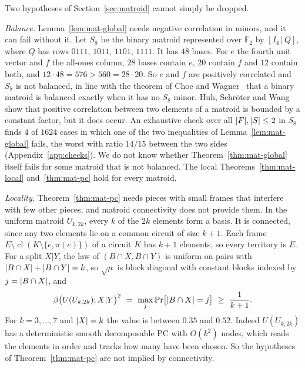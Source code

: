 Two hypotheses of Section~\ref{sec:matroid} cannot simply be dropped.

\emph{Balance.} Lemma~\ref{lem:mat-global} needs negative correlation in minors, and it can fail without it. Let $S_8$ be the binary matroid represented over $\mathbb F_2$ by $[I_4\,|\,Q]$, where $Q$ has rows $0111$, $1011$, $1101$, $1111$. It has $48$ bases. For $e$ the fourth unit vector and $f$ the all-ones column, $28$ bases contain $e$, $20$ contain $f$ and $12$ contain both, and $12\cdot48=576>560=28\cdot20$. So $e$ and $f$ are positively correlated and $S_8$ is not balanced, in line with the theorem of Choe and Wagner~\cite{ChoeWagner03} that a binary matroid is balanced exactly when it has no $S_8$ minor. Huh, Schr\"oter and Wang~\cite{HSW22} show that positive correlation between two elements of a matroid is bounded by a constant factor, but it does occur. An exhaustive check over all $\lvert F\rvert,\lvert S\rvert\le2$ in $S_8$ finds $4$ of $1624$ cases in which one of the two inequalities of Lemma~\ref{lem:mat-global} fails, the worst with ratio $14/15$ between the two sides (Appendix~\ref{app:checks}). We do not know whether Theorem~\ref{thm:mat-global} itself fails for some matroid that is not balanced. The local Theorems~\ref{thm:mat-local} and~\ref{thm:mat-pc} hold for every matroid.

\emph{Locality.} Theorem~\ref{thm:mat-pc} needs pieces with small frames that interfere with few other pieces, and matroid connectivity does not provide them. In the uniform matroid $U_{k,2k}$, every $k$ of the $2k$ elements form a basis. It is connected, since any two elements lie on a common circuit of size $k+1$. Each frame $E\setminus\operatorname{cl}(K\setminus\{e,\pi(e)\})$ of a circuit $K$ has $k+1$ elements, so every territory is $E$. For a split $X|Y$, the law of $(B\cap X,B\cap Y)$ is uniform on pairs with $\lvert B\cap X\rvert+\lvert B\cap Y\rvert=k$, so $\sqrt\mu$ is block diagonal with constant blocks indexed by $j=\lvert B\cap X\rvert$, and
\[
  \beta\bigl(U(U_{k,2k});X|Y\bigr)^2\ =\ \max_j\Pr\bigl[\abs{B\cap X}=j\bigr]\ \ge\ \frac1{k+1}.
\]
For $k=3,\dots,7$ and $\lvert X\rvert=k$ the value is between $0.35$ and $0.52$. Indeed $U(U_{k,2k})$ has a deterministic smooth decomposable PC with $O(k^2)$ nodes, which reads the elements in order and tracks how many have been chosen. So the hypotheses of Theorem~\ref{thm:mat-pc} are not implied by connectivity.
